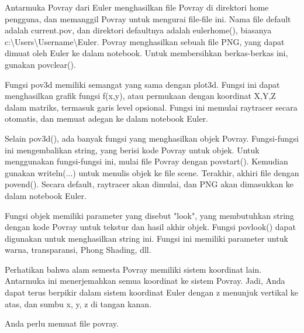 \documentclass[12pt,Times new roman,letterpaper]{book}
\begin{document}
\begin{eulernootebook}
\begin{eulercomment}
\begin{eulercomment}
\begin{eulernootebook}
\begin{eulercomment}
\begin{eulercomment}
\begin{eulercomment}
\begin{eulercomment}
\begin{eulercomment}
\begin{eulercomment}
\begin{eulercomment}
\begin{eulernotebook}
\begin{eulercomment}
Antarmuka Povray dari Euler menghasilkan file Povray di direktori home
pengguna, dan memanggil Povray untuk mengurai file-file ini. Nama file
default adalah current.pov, dan direktori defaultnya adalah
eulerhome(), biasanya c:\textbackslash{}Users\textbackslash{}Username\textbackslash{}Euler. Povray menghasilkan
sebuah file PNG, yang dapat dimuat oleh Euler ke dalam notebook. Untuk
membersihkan berkas-berkas ini, gunakan povclear().

Fungsi pov3d memiliki semangat yang sama dengan plot3d. Fungsi ini
dapat menghasilkan grafik fungsi f(x,y), atau permukaan dengan
koordinat X,Y,Z dalam matriks, termasuk garis level opsional. Fungsi
ini memulai raytracer secara otomatis, dan memuat adegan ke dalam
notebook Euler.

Selain pov3d(), ada banyak fungsi yang menghasilkan objek Povray.
Fungsi-fungsi ini mengembalikan string, yang berisi kode Povray untuk
objek. Untuk menggunakan fungsi-fungsi ini, mulai file Povray dengan
povstart(). Kemudian gunakan writeln(...) untuk menulis objek ke file
scene. Terakhir, akhiri file dengan povend(). Secara default,
raytracer akan dimulai, dan PNG akan dimasukkan ke dalam notebook
Euler.

Fungsi objek memiliki parameter yang disebut "look", yang membutuhkan
string dengan kode Povray untuk tekstur dan hasil akhir objek. Fungsi
povlook() dapat digunakan untuk menghasilkan string ini. Fungsi ini
memiliki parameter untuk warna, transparansi, Phong Shading, dll.

Perhatikan bahwa alam semesta Povray memiliki sistem koordinat lain.
Antarmuka ini menerjemahkan semua koordinat ke sistem Povray. Jadi,
Anda dapat terus berpikir dalam sistem koordinat Euler dengan z
menunjuk vertikal ke atas, dan sumbu x, y, z di tangan kanan.

Anda perlu memuat file povray.


\end{eulercomment}
\end{eulernotebook}
\end{eulercomment}
\end{eulercomment}
\end{eulercomment}
\end{eulercomment}
\end{eulercomment}
\end{eulercomment}
\end{eulercomment}
\end{eulernootebook}
\end{eulercomment}
\end{eulercomment}
\end{eulernootebook}
\end{document}
